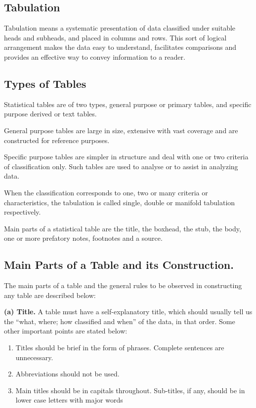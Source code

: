 \documentclass[]{article}
\begin{document}
\hypertarget{tabulation}{%
\subsection{Tabulation}\label{tabulation}}

Tabulation means a systematic presentation of data classified under
suitable heads and subheads, and placed in columns and rows. This sort
of logical arrangement makes the data easy to understand, facilitates
comparisons and provides an effective way to convey information to a
reader.

\hypertarget{types-of-tables}{%
\subsection{Types of Tables}\label{types-of-tables}}

Statistical tables are of two types, general purpose or primary tables,
and specific purpose derived or text tables.

General purpose tables are large in size, extensive with vast coverage
and are constructed for reference purposes.

Specific purpose tables are simpler in structure and deal with one or
two criteria of classification only. Such tables are used to analyse or
to assist in analyzing data.

When the classification corresponds to one, two or many criteria or
characteristics, the tabulation is called single, double or manifold
tabulation respectively.

Main parts of a statistical table are the title, the boxhead, the stub,
the body, one or more prefatory notes, footnotes and a source.

\hypertarget{main-parts-of-a-table-and-its-construction.}{%
\subsection{Main Parts of a Table and its
Construction.}\label{main-parts-of-a-table-and-its-construction.}}

The main parts of a table and the general rules to be observed in
constructing any table are described below:

\textbf{(a) Title.} A table must have a self-explanatory title, which
should usually tell us the ``what, where; how classified and when'' of
the data, in that order. Some other important points are stated below:

\begin{enumerate}
\def\labelenumi{(\roman{enumi})}
\item
  Titles should be brief in the form of phrases. Complete sentences are
  unnecessary.
\item
  Abbreviations should not be used.
\item
  Main titles should be in capitals throughout. Sub-titles, if any,
  should be in lower case letters with major words
\end{enumerate}
\end{document}
